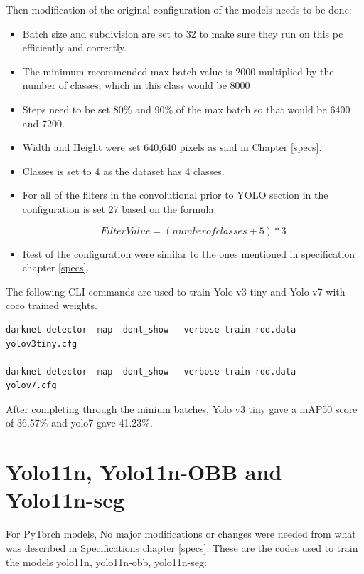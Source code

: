 Then modification of the original configuration of the models needs to be done:
\begin{itemize}
    
 \item Batch size and subdivision are set to 32 to make sure they run on this pc efficiently and correctly.

\item The minimum recommended max batch value is 2000 multiplied by the number of classes, which in this class would be 8000

\item Steps need to be set 80\% and 90\% of the max batch so that would be 6400 and 7200.

\item Width and Height were set 640,640 pixels as said in Chapter \ref{specs}.

\item Classes is set to 4 as the dataset has 4 classes.

 \item For all of the filters in the convolutional prior to YOLO section in the configuration is set 27 based on the formula:

\begin{equation}
    Filter Value = (number of classes + 5)*3
\end{equation}

\item Rest of the configuration were similar to the ones mentioned in specification chapter \ref{specs}.
\end{itemize}

The following CLI commands are used to train Yolo v3 tiny and Yolo v7 with coco trained weights.

\begin{verbatim}
darknet detector -map -dont_show --verbose train rdd.data
yolov3tiny.cfg  

darknet detector -map -dont_show --verbose train rdd.data
yolov7.cfg
\end{verbatim}

After completing through the minium batches, Yolo v3 tiny gave a mAP50 score of 36.57\% and yolo7 gave 41.23\%.

\section{Yolo11n, Yolo11n-OBB and Yolo11n-seg}
For PyTorch models, No major modifications or changes were needed from what was described in Specifications chapter \ref{specs}. These are the codes used to train the models yolo11n, yolo11n-obb, yolo11n-seg:

